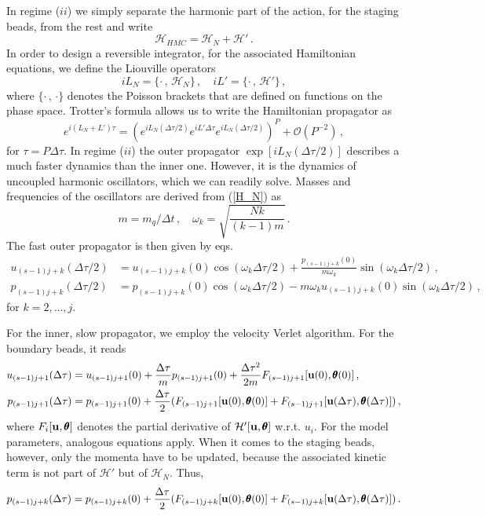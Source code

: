 \documentclass[11pt, a4paper]{article}
\newcommand{\vc}[1]{{\bf #1 }}
\begin{document}
In regime ($ii$) we simply separate the harmonic part of the action, for the staging beads, from the rest and write
\begin{equation}
  \mathcal H_{HMC}=\mathcal H_N + \mathcal H'\,.
\end{equation}
In order to design a reversible integrator, for the associated Hamiltonian equations, we define the Liouville operators
\begin{equation}
  iL_N=\{\cdot\,,\,\mathcal H_N\}\,,\quad
  iL'=\{\cdot\,,\,\mathcal H'\}\,,
\end{equation}
where $\{\cdot\,,\,\cdot\}$ denotes the Poisson brackets that are defined on functions on the phase space.
Trotter's formula allows us to write the Hamiltonian propagator as
\begin{equation}
  e^{i(L_N+L')\tau}
  =
  (e^{iL_N(\Delta\tau/2)}e^{iL'\Delta\tau}e^{iL_N(\Delta\tau/2)})^P
  +
  \mathcal O(P^{-2})\,,
\end{equation}
for $\tau =P\Delta \tau$.
In regime ($ii$) the outer propagator $\exp[iL_N(\Delta \tau/2)]$ describes a much faster dynamics than the inner one.
However, it is the dynamics of uncoupled harmonic oscillators, which we can readily solve.
Masses and frequencies of the oscillators are derived from (\ref{H_N}) as
\begin{equation}
  m=m_q/\Delta t\,,\quad
  \omega_k=\sqrt{\frac{Nk}{(k-1)m}}\,.
\end{equation}
The fast outer propagator is then given by eqs.
\begin{align}
  u_{(s-1)j+k}(\Delta\tau/2)
  &=
  u_{(s-1)j+k}(0)\cos(\omega_k\Delta\tau/2)
  +
  \frac{p_{(s-1)j+k}(0)}{m\omega_k}\sin(\omega_k\Delta\tau/2)\,,\\
  p_{(s-1)j+k}(\Delta\tau/2)
  &=
  p_{(s-1)j+k}(0)\cos(\omega_k\Delta\tau/2)
  -
  m\omega_k u_{(s-1)j+k}(0) \sin(\omega_k\Delta\tau/2)\,,
\end{align}
for $k=2,\dots,j$.

For the inner, slow propagator, we employ the velocity Verlet algorithm.
For the boundary beads, it reads
\begin{align}
  u_{(s-1)j+1}(\Delta\tau)
  &=
  u_{(s-1)j+1}(0)
  +
  \frac{\Delta\tau}{m} p_{(s-1)j+1}(0)
  +
  \frac{\Delta \tau^2}{2m}
  F_{(s-1)j+1}[\vc u(0),{\pmb\theta}(0)]\,,\\
  p_{(s-1)j+1}(\Delta\tau)
  &=
  p_{(s-1)j+1}(0)
  +
  \frac{\Delta\tau}{2}
  (
  F_{(s-1)j+1}[\vc u(0),{\pmb\theta}(0)]
  +
  F_{(s-1)j+1}[\vc u(\Delta\tau),{\pmb\theta}(\Delta\tau)]
  )\,,
\end{align}
where $F_i[\vc u,{\pmb\theta}]$ denotes the partial derivative of $\mathcal H'[\vc u,{\pmb\theta}]$ w.r.t. $u_i$.
For the model parameters, analogous equations apply.
When it comes to the staging beads, however, only the momenta have to be updated, because the associated kinetic term is not part of $\mathcal H'$ but of $\mathcal H_N$.
Thus,
\begin{equation}
  p_{(s-1)j+k}(\Delta\tau)
  =
  p_{(s-1)j+k}(0)
  +
  \frac{\Delta\tau}{2}
  (
  F_{(s-1)j+k}[\vc u(0),{\pmb\theta}(0)]
  +
  F_{(s-1)j+k}[\vc u(\Delta\tau),{\pmb\theta}(\Delta\tau)]
  )
  \,.
\end{equation}
\end{document}
